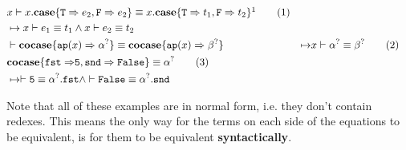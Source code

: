 \documentclass[twoside,12pt,a4paper]{article}
\begin{document}
\begin{example}
    \begin{align*}
    &x\vdash x.\expatmatch{\texttt{T} \Rightarrow e_2, \texttt{F} \Rightarrow e_2} \equiv x.\expatmatch{\texttt{T} \Rightarrow t_1, \texttt{F} \Rightarrow t_2}\footnotemark{}\tag{1}
    \\ &\mapsto x\vdash  e_1 \equiv t_1\wedge x\vdash e_2\equiv t_2
    \\
    &\vdash \excopatmatch{\ap{x}\Rightarrow \alphaunifvar} \equiv \excopatmatch{\ap{x}\Rightarrow\betaunifvar} 
    &\mapsto&x\vdash \alphaunifvar \equiv \betaunifvar
    \tag{2}\\
    &\excopatmatch{\mathtt{fst \Rightarrow} \mathtt{5}, \mathtt{snd\Rightarrow False}}\equiv \alphaunifvar \tag{3}
    \\ &\mapsto \vdash \mathtt{5}\equiv \alphaunifvar.\mathtt{fst}\wedge \vdash \mathtt{False\equiv\alphaunifvar.snd}
    \end{align*}
\end{example}
Note that all of these examples are in normal form, i.e. they don't contain redexes.
This means the only way for the terms on each side of the equations to be equivalent,
is for them to be equivalent \textbf{syntactically}. 
\end{document}
